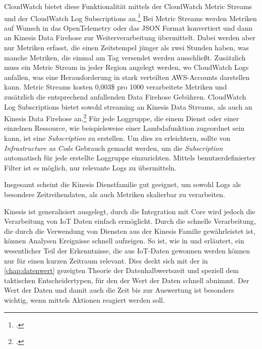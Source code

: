 CloudWatch bietet diese Funktionalität mittels der CloudWatch Metric Streams und der CloudWatch Log Subscriptions an.\footcite[Vgl. auch im Folgenden][]{Barr.2021} Bei Metric Streams werden Metriken auf Wunsch in das OpenTelemetry oder das \ac{JSON} Format konvertiert und dann an Kinesis Data Firehose zur Weiterverarbeitung übermittelt. Dabei werden aber nur Metriken erfasst, die einen Zeitstempel jünger als zwei Stunden haben, was manche Metriken, die einmal am Tag versendet werden ausschließt. Zusätzlich muss ein Metric Stream in jeder Region angelegt werden, wo CloudWatch Logs anfallen, was eine Herausforderung in stark verteilten \ac{AWS}-Accounts darstellen kann. Metric Streams kosten 0,003\$ pro 1000 verarbeitete Metriken und zusätzlich die entsprechend anfallenden Data Firehose Gebühren. CloudWatch Log Subscriptions bietet sowohl streaming an Kinesis Data Streams, als auch an Kinesis Data Firehose an.\footcite[Vgl. auch im Folgenden][]{AmazonWebServicesInc..o.J.bk} Für jede Loggruppe, die einem Dienst oder einer einzelnen Ressource, wie beispielsweise einer Lambdafunktion zugeordnet sein kann, ist eine \textit{Subscription} zu erstellen. Um dies zu erleichtern, sollte von \textit{Infrastructure as Code} Gebrauch gemacht werden, um die \textit{Subscription} automatisch für jede erstellte Loggruppe einzurichten. Mittels benutzerdefinierter Filter ist es möglich, nur relevante Logs zu übermitteln.

Insgesamt scheint die Kinesis Dienstfamilie gut geeignet, um sowohl Logs als besondere Zeitreihendaten, als auch Metriken skalierbar zu verarbeiten.

Kinesis ist generalisiert ausgelegt, durch die Integration mit \AWSIOT{} Core wird jedoch die Verarbeitung von \ac{IoT} Daten einfach ermöglicht. Durch die schnelle Verarbeitung, die durch die Verwendung von Diensten aus der Kinesis Familie gewährleistet ist, können Analysen Ereignisse schnell aufzeigen. So ist, wie in  und  erläutert, ein wesentlicher Teil der Erkenntnisse, die aus \ac{IoT}-Daten gewonnen werden können nur für einen kurzen Zeitraum relevant. Dies deckt sich mit der in \autoref{chap:datenwert} gezeigten Theorie der Datenhalbwertszeit und speziell dem taktischen Entscheidertypen, für den der Wert der Daten schnell abnimmt. Der Wert der Daten und damit auch die Zeit bis zur Auswertung ist besonders wichtig, wenn mittels Aktionen reagiert werden soll.

